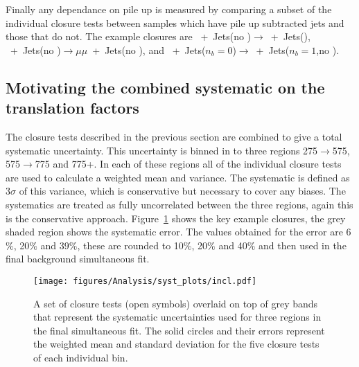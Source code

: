 Finally any dependance on pile up is measured by comparing a subset of the 
individual closure tests between samples which have pile up subtracted jets and 
those that do not. The example closures are \Pmu~+~Jets(no \alt)$\rightarrow$\Pmu~+~Jets(\altg),
\Pmu~+~Jets(no \alt)$\rightarrow$$\mu\mu$~+~Jets(no \alt), and \Pmu~+~Jets($n_b = 0$)$\rightarrow$\Pmu~+~Jets($n_b 
= 1$,no \alt).

\subsection{Motivating the combined systematic on the translation factors}
\label{sub:motivating_the_combined_systematic_on_the_translation_factors}
The closure tests described in the previous section are combined to give a 
total systematic uncertainty. This uncertainty is binned in to three \HT 
regions \unit{275}{\GeV}$\rightarrow$\unit{575}{\GeV}, 
\unit{575}{\GeV}$\rightarrow$\unit{775}{\GeV} and \unit{775}{\GeV}+. In each of 
these regions all of the individual closure tests are used to calculate a 
weighted mean and variance. The systematic is defined as $3\sigma$ of this 
variance, which is conservative but necessary to cover any biases. The 
systematics are treated as fully uncorrelated between the three regions, again 
this is the conservative approach. Figure~\ref{fig:closure-summary} shows the 
key example closures, the grey shaded region shows the systematic error. The 
values obtained for the error are 6$\%$, 20$\%$ and 39$\%$, these are rounded 
to 10$\%$, 20$\%$ and 40$\%$ and then used in the final background simultaneous 
fit.

\begin{figure}[!h]
  \begin{center}
    \texttt{[image: figures/Analysis/syst\_plots/incl.pdf]}
    \caption{A set of closure tests (open symbols) overlaid on top of
      grey bands that represent the systematic uncertainties used for
      three \HT regions in the final simultaneous fit. The solid
      circles and their errors represent the weighted mean and
      standard deviation for the five closure tests of each individual
      \HT bin.}
    \label{fig:closure-summary}
  \end{center}
\end{figure}




